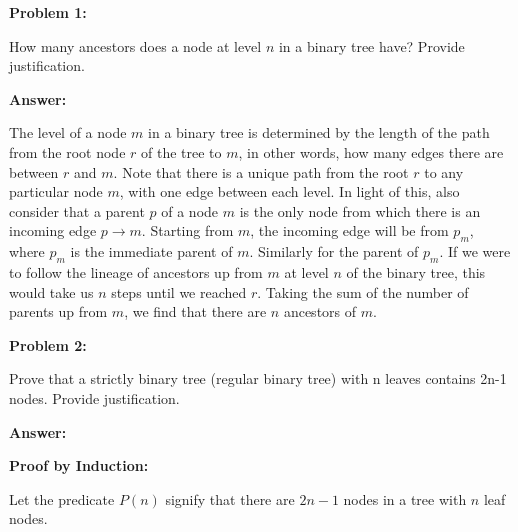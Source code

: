 \documentclass[10pt,letterpaper,final]{report}
\begin{document}
\begin{center}
  \vline
\end{center}

\medskip

\noindent\textbf{Problem 1:}
\medskip

How many ancestors does a node at level $n$ in a binary tree have? Provide justification.

\medskip
\noindent\textbf{Answer:}
\medskip

The level of a node $m$ in a binary tree is determined by the length of the path from the root node $r$ of the tree to $m$, in other words, how many edges there are between $r$ and $m$. Note that there is a unique path from the root $r$ to any particular node $m$, with one edge between each level. In light of this, also consider that a parent $p$ of a node $m$ is the only node from which there is an incoming edge $p \to m$. Starting from $m$, the incoming edge will be from $p_m$, where $p_m$ is the immediate parent of $m$. Similarly for the parent of $p_m$. If we were to follow the lineage of ancestors up from $m$ at level $n$ of the binary tree, this would take us $n$ steps until we reached $r$. Taking the sum of the number of parents up from $m$, we find that there are $n$ ancestors of $m$.

\medskip
\noindent\textbf{Problem 2:}
\medskip

Prove that a strictly binary tree (regular binary tree) with n leaves contains 2n-1 nodes. Provide justification.

\medskip
\noindent\textbf{Answer:}
\medskip

\textbf{Proof by Induction:}

\noindent Let the predicate $P(n)$ signify that there are $2n - 1$ nodes in a tree with $n$ leaf nodes.
\end{document}
